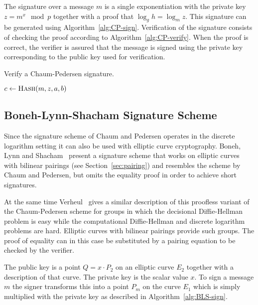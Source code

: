 The signature over a message $m$ is a single exponentiation with the private key
$z = m^x \mod p$ together with a proof that $\log_g h = \log_m z$. This
signature can be generated using Algorithm~\ref{alg:CP-sign}. Verification of
the signature consists of checking the proof according to
Algorithm~\ref{alg:CP-verify}. When the proof is correct, the verifier is
assured that the message is signed using the private key corresponding to the
public key used for verification.

\begin{algorithm}[t]
  \caption{Verify a Chaum-Pedersen signature.}
  \label{alg:CP-verify}
  \addtolength{\baselineskip}{1mm}
  \begin{algorithmic}[1]
      \State $c \gets \Call{Hash}{m, z, a, b}$

      \Return {}
      \EndIf

      \Return {}
      \EndIf

      \Return {}
    \EndFunction
  \end{algorithmic}
\end{algorithm}

\subsection{Boneh-Lynn-Shacham Signature Scheme}

Since the signature scheme of Chaum and Pedersen operates in the discrete
logarithm setting it can also be used with elliptic curve cryptography. Boneh,
Lynn and Shacham~\cite{BonehLS01,BonehLS04} present a signature scheme that
works on elliptic curves with bilinear pairings (see Section~\ref{sec:pairing})
and resembles the scheme by Chaum and Pedersen, but omits the equality proof in
order to achieve short signatures.

At the same time Verheul~\cite{Verheul01} gives a similar description of this
proofless variant of the Chaum-Pedersen scheme for groups in which the
decisional Diffie-Hellman problem is easy while the computational Diffie-Hellman
and discrete logarithm problems are hard. Elliptic curves with bilinear pairings
provide such groups. The proof of equality can in this case be substituted by a
pairing equation to be checked by the verifier.

The public key is a point $Q = x \cdot P_2$ on an elliptic curve $E_2$ together
with a description of that curve. The private key is the scalar value $x$. To
sign a message $m$ the signer transforms this into a point $P_m$ on the curve
$E_1$ which is simply multiplied with the private key as described in
Algorithm~\ref{alg:BLS-sign}.


